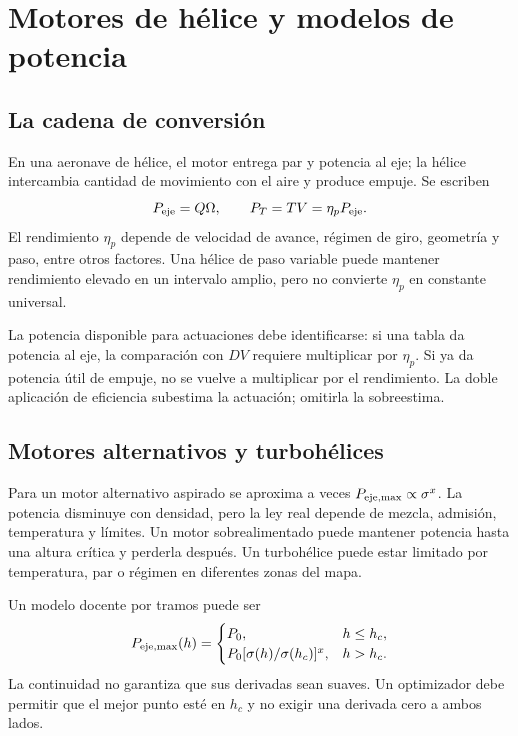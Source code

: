 \chapter{Motores de hélice y modelos de potencia}\label{ch:props}

\section{La cadena de conversión}
En una aeronave de hélice, el motor entrega par y potencia al eje; la hélice intercambia cantidad de movimiento con el aire y produce empuje. Se escriben
\begin{equation}
P_{\rm eje}=Q\Omega,\qquad P_T=TV=\eta_pP_{\rm eje}.
\end{equation}
El rendimiento $\eta_p$ depende de velocidad de avance, régimen de giro, geometría y paso, entre otros factores. Una hélice de paso variable puede mantener rendimiento elevado en un intervalo amplio, pero no convierte $\eta_p$ en constante universal.

La potencia disponible para actuaciones debe identificarse: si una tabla da potencia al eje, la comparación con $DV$ requiere multiplicar por $\eta_p$. Si ya da potencia útil de empuje, no se vuelve a multiplicar por el rendimiento. La doble aplicación de eficiencia subestima la actuación; omitirla la sobreestima.

\section{Motores alternativos y turbohélices}
Para un motor alternativo aspirado se aproxima a veces $P_{\rm eje,\max}\propto\sigma^x$. La potencia disminuye con densidad, pero la ley real depende de mezcla, admisión, temperatura y límites. Un motor sobrealimentado puede mantener potencia hasta una altura crítica y perderla después. Un turbohélice puede estar limitado por temperatura, par o régimen en diferentes zonas del mapa.

Un modelo docente por tramos puede ser
\begin{equation}
P_{\rm eje,\max}(h)=
\begin{cases}P_0,&h\leq h_c,\\P_0[\sigma(h)/\sigma(h_c)]^x,&h>h_c.\end{cases}
\end{equation}
La continuidad no garantiza que sus derivadas sean suaves. Un optimizador debe permitir que el mejor punto esté en $h_c$ y no exigir una derivada cero a ambos lados.

